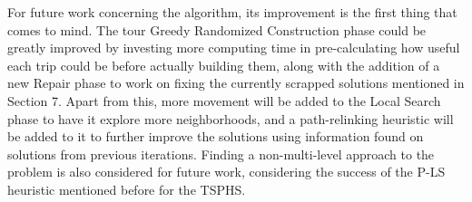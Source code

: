 For future work concerning the algorithm, its improvement is the first thing that comes to mind. The tour Greedy Randomized Construction phase could be greatly improved by investing more computing time in pre-calculating how useful each trip could be before actually building them, along with the addition of a new Repair phase to work on fixing the currently scrapped solutions mentioned in Section 7. Apart from this, more movement will be added to the Local Search phase to have it explore more neighborhoods, and a path-relinking heuristic will be added to it to further improve the solutions using information found on solutions from previous iterations. Finding a non-multi-level approach to the problem is also considered for future work, considering the success of the P-LS heuristic mentioned before for the TSPHS.